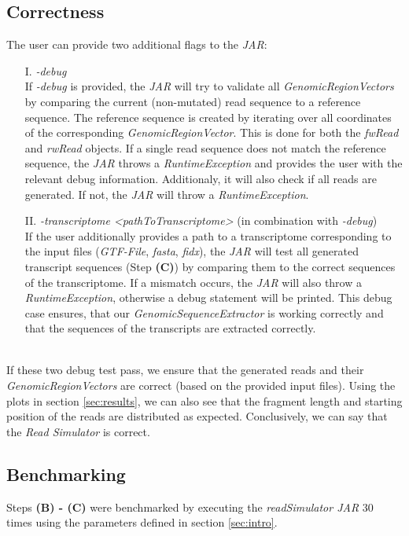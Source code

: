 \documentclass[12pt]{article}
\begin{document}
\subsection{Correctness}
The user can provide two additional flags to the \textit{JAR}:
\begin{enumerate}
	\item[I.] \textit{-debug}\\
		If \textit{-debug} is provided, the \textit{JAR} will try to validate all \textit{GenomicRegionVectors} by comparing the current (non-mutated) read sequence
		to a reference sequence. The reference sequence is created by iterating over all coordinates of the corresponding \textit{GenomicRegionVector}.
		This is done for both the \textit{fwRead} and \textit{rwRead} objects. If a single read sequence does not match the reference sequence,
		the \textit{JAR} throws a \textit{RuntimeException} and provides the user with the relevant debug information.
        Additionaly, it will also check if all reads are generated. If not, the \textit{JAR} will throw a \textit{RuntimeException}.

	\item[II.] \textit{-transcriptome <pathToTranscriptome>} (in combination with \textit{-debug})\\
		If the user additionally provides a path to a transcriptome corresponding to the input files (\textit{GTF-File}, \textit{fasta}, \textit{fidx}), the \textit{JAR} will
		test all generated transcript sequences (Step \textbf{(C)}) by comparing them to the correct sequences of the transcriptome. If a mismatch
		occurs, the \textit{JAR} will also throw a \textit{RuntimeException}, otherwise a debug statement will be printed.
        This debug case ensures, that our \textit{GenomicSequenceExtractor} is working correctly and that the sequences of the transcripts are extracted correctly.
\end{enumerate}
\hspace{0.1mm} \\
If these two debug test pass, we ensure that the generated reads and their \textit{GenomicRegionVectors} are correct (based on the provided input files).
Using the plots in section \ref{sec:results}, we can also see that the fragment length and starting position of the reads are distributed as expected.
Conclusively, we can say that the \textit{Read Simulator} is correct.



\subsection{Benchmarking}
Steps \textbf{(B) - (C)} were benchmarked by executing the \textit{readSimulator JAR} 30 times using the parameters defined in section \ref{sec:intro}.
\end{document}
